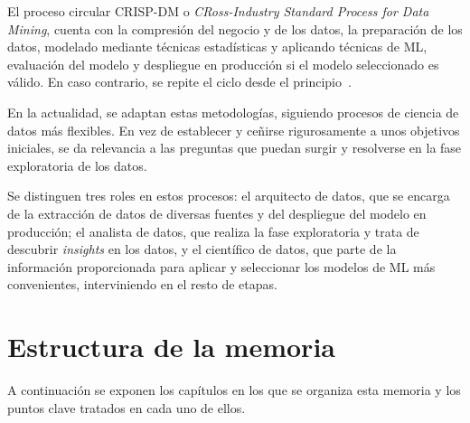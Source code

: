 \documentclass[a4paper, 12pt]{book}
\begin{document}
El proceso circular CRISP-DM o \emph{CRoss-Industry Standard Process for Data Mining}, cuenta con la compresión del negocio y de los datos, la preparación de los datos, modelado mediante técnicas estadísticas y aplicando técnicas de ML, evaluación del modelo y despliegue en producción si el modelo seleccionado es válido. En caso contrario, se repite el ciclo desde el principio~\cite{azevedo2008kdd, navlani2021python}.

En la actualidad, se adaptan estas metodologías, siguiendo procesos de ciencia de datos más flexibles. En vez de establecer y ceñirse rigurosamente a unos objetivos iniciales, se da relevancia a las preguntas que puedan surgir y resolverse en la fase exploratoria de los datos. 

Se distinguen tres roles en estos procesos: el arquitecto de datos, que se encarga de la extracción de datos de diversas fuentes y del despliegue del modelo en producción; el analista de datos, que realiza la fase exploratoria y trata de descubrir \emph{insights} en los datos, y el científico de datos, que parte de la información proporcionada para aplicar y seleccionar los modelos de ML más convenientes, interviniendo en el resto de etapas.

\section{Estructura de la memoria}
\label{sec:estructura}

A continuación se exponen los capítulos en los que se organiza esta memoria y los puntos clave tratados en cada uno de ellos. 
\end{document}
